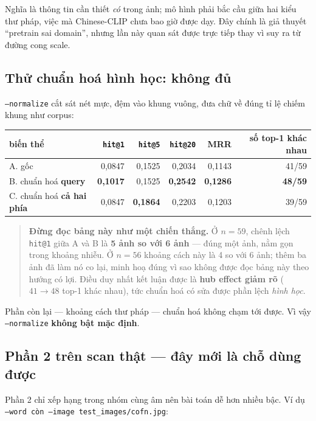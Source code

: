 \documentclass[11pt,a4paper]{article}
\newcommand{\code}[1]{\texttt{#1}}
\begin{document}
Nghĩa là thông tin cần thiết \emph{có} trong ảnh; mô hình phải bắc cầu giữa hai kiểu thư pháp, việc
mà Chinese-CLIP chưa bao giờ được dạy. Đây chính là giả thuyết ``pretrain sai domain'', nhưng lần
này quan sát được trực tiếp thay vì suy ra từ đường cong scale.

\subsection{Thử chuẩn hoá hình học: không đủ}

\code{--normalize} cắt sát nét mực, đệm vào khung vuông, đưa chữ về đúng tỉ lệ chiếm khung như corpus:

\begin{table}[h]
\centering
\begin{tabular}{lrrrrr}
\toprule
biến thể & \code{hit@1} & \code{hit@5} & \code{hit@20} & MRR & số top-1 khác nhau \\
\midrule
A. gốc & 0,0847 & 0,1525 & 0,2034 & 0,1143 & 41/59 \\
B. chuẩn hoá \textbf{query} & \textbf{0,1017} & 0,1525 & \textbf{0,2542} & \textbf{0,1286} & \textbf{48/59} \\
C. chuẩn hoá \textbf{cả hai phía} & 0,0847 & \textbf{0,1864} & 0,2203 & 0,1203 & 39/59 \\
\bottomrule
\end{tabular}
\end{table}

\begin{quote}
\textbf{Đừng đọc bảng này như một chiến thắng.} Ở $n = 59$, chênh lệch \code{hit@1} giữa A và B là
\textbf{5 ảnh so với 6 ảnh} --- đúng một ảnh, nằm gọn trong khoảng nhiễu. Ở $n = 56$ khoảng cách này
là 4 so với 6 ảnh; thêm ba ảnh đã làm nó co lại, minh hoạ đúng vì sao không được đọc bảng này theo
hướng có lợi. Điều duy nhất kết luận được là \textbf{hub effect giảm rõ} ($41 \to 48$ top-1 khác
nhau), tức chuẩn hoá có sửa được phần lệch \emph{hình học}.
\end{quote}

Phần còn lại --- khoảng cách thư pháp --- chuẩn hoá không chạm tới được. Vì vậy \code{--normalize}
\textbf{không bật mặc định}.

\subsection{Phần 2 trên scan thật --- đây mới là chỗ dùng được}

Phần 2 chỉ xếp hạng trong nhóm cùng âm nên bài toán dễ hơn nhiều bậc. Ví dụ
\code{--word còn --image test\_images/cofn.jpg}:
\end{document}
